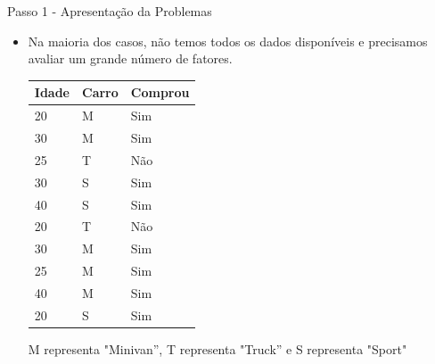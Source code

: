 \documentclass{beamer}
\begin{document}




\begin{frame}{Passo 1 - Apresentação da Problemas}

\begin{itemize}

\item Na maioria dos casos, não temos todos os dados disponíveis e precisamos avaliar um grande número de fatores.

\begin{center}
\begin{tabular}{|l|l|l|}
\hline
Idade & Carro & Comprou\\
\hline
20  & M & Sim\\
30  & M & Sim\\
25  & T & Não\\
30  & S & Sim\\
40  & S & Sim\\
20  & T & Não\\
30  & M & Sim\\
25  & M & Sim\\
40  & M & Sim\\
20  & S & Sim\\






\hline

\end{tabular}
\end{center}

M representa "Minivan'', T representa "Truck'' e S representa "Sport" 



 
    

\end{itemize}



\end{frame}
\end{document}
